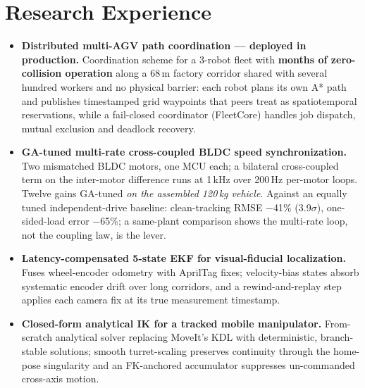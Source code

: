 \documentclass[a4paper,20pt]{article}
\begin{document}
\vspace{2pt}
\section{\textbf{Research Experience}}

\begin{itemize}[leftmargin=*, itemsep=3.5pt, parsep=0pt, topsep=3pt]

    \item \textbf{Distributed multi-AGV path coordination --- deployed in production.} Coordination scheme for a 3-robot fleet with \textbf{months of zero-collision operation} along a 68\,m factory corridor shared with several hundred workers and no physical barrier: each robot plans its own A* path and publishes timestamped grid waypoints that peers treat as spatiotemporal reservations, while a fail-closed coordinator (FleetCore) handles job dispatch, mutual exclusion and deadlock recovery. \vspace{-5pt}

    \item \textbf{GA-tuned multi-rate cross-coupled BLDC speed synchronization.} Two mismatched BLDC motors, one MCU each; a bilateral cross-coupled term on the inter-motor difference runs at 1\,kHz over 200\,Hz per-motor loops. Twelve gains GA-tuned \emph{on the assembled 120\,kg vehicle}. Against an equally tuned independent-drive baseline: clean-tracking RMSE $-$41\% (3.9$\sigma$), one-sided-load error $-$65\%; a same-plant comparison shows the multi-rate loop, not the coupling law, is the lever. \vspace{-5pt}

    \item \textbf{Latency-compensated 5-state EKF for visual-fiducial localization.} Fuses wheel-encoder odometry with AprilTag fixes; velocity-bias states absorb systematic encoder drift over long corridors, and a rewind-and-replay step applies each camera fix at its true measurement timestamp. \vspace{-5pt}

    \item \textbf{Closed-form analytical IK for a tracked mobile manipulator.} From-scratch analytical solver replacing MoveIt's KDL with deterministic, branch-stable solutions; smooth turret-scaling preserves continuity through the home-pose singularity and an FK-anchored accumulator suppresses un-commanded cross-axis motion. \vspace{-5pt}


\end{itemize}
\end{document}
